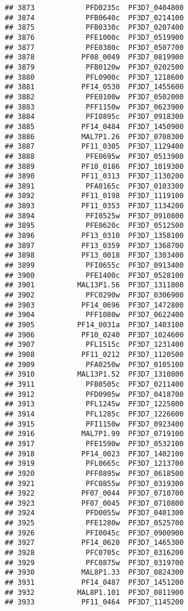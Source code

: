 \documentclass[12pt, a4paper]{article}\usepackage[]{graphicx}\usepackage[]{color}
\makeatletter
\newenvironment{kframe}{%
 \def\at@end@of@kframe{}%
 \ifinner\ifhmode%
  \def\at@end@of@kframe{\end{minipage}}%
  \begin{minipage}{\columnwidth}%
 \fi\fi%
 \def\FrameCommand##1{\hskip\@totalleftmargin \hskip-\fboxsep
 \colorbox{shadecolor}{##1}\hskip-\fboxsep
     \hskip-\linewidth \hskip-\@totalleftmargin \hskip\columnwidth}%
 \MakeFramed {\advance\hsize-\width
   \@totalleftmargin\z@ \linewidth\hsize
   \@setminipage}}%
 {\par\unskip\endMakeFramed%
 \at@end@of@kframe}
\newenvironment{knitrout}{}{} %
\makeatother
\begin{document}
\begin{knitrout}
\begin{kframe}
\begin{verbatim}
## 3873            PFD0235c  PF3D7_0404800
## 3874            PFB0640c  PF3D7_0214100
## 3875            PFB0330c  PF3D7_0207400
## 3876            PFE1000c  PF3D7_0519900
## 3877            PFE0380c  PF3D7_0507700
## 3878           PF08_0049  PF3D7_0819900
## 3879            PFB0120w  PF3D7_0202500
## 3880            PFL0900c  PF3D7_1218600
## 3881           PF14_0530  PF3D7_1455600
## 3882            PFE0100w  PF3D7_0502000
## 3883            PFF1150w  PF3D7_0623900
## 3884            PFI0895c  PF3D7_0918300
## 3885           PF14_0484  PF3D7_1450900
## 3886           MAL7P1.26  PF3D7_0708300
## 3887           PF11_0305  PF3D7_1129400
## 3888            PFE0695w  PF3D7_0513900
## 3889           PF10_0186  PF3D7_1019300
## 3890           PF11_0313  PF3D7_1130200
## 3891            PFA0165c  PF3D7_0103300
## 3892           PF11_0198  PF3D7_1119100
## 3893           PF11_0353  PF3D7_1134200
## 3894            PFI0525w  PF3D7_0910800
## 3895            PFE0620c  PF3D7_0512500
## 3896           PF13_0310  PF3D7_1358100
## 3897           PF13_0359  PF3D7_1368700
## 3898           PF13_0018  PF3D7_1303400
## 3899            PFI0655c  PF3D7_0913400
## 3900            PFE1400c  PF3D7_0528100
## 3901          MAL13P1.56  PF3D7_1311800
## 3902            PFC0290w  PF3D7_0306900
## 3903           PF14_0696  PF3D7_1472800
## 3904            PFF1080w  PF3D7_0622400
## 3905          PF14_0031a  PF3D7_1403100
## 3906           PF10_0240  PF3D7_1024600
## 3907            PFL1515c  PF3D7_1231400
## 3908           PF11_0212  PF3D7_1120500
## 3909            PFA0250w  PF3D7_0105100
## 3910          MAL13P1.52  PF3D7_1310800
## 3911            PFB0505c  PF3D7_0211400
## 3912            PFD0905w  PF3D7_0418700
## 3913            PFL1245w  PF3D7_1225800
## 3914            PFL1285c  PF3D7_1226600
## 3915            PFI1150w  PF3D7_0923400
## 3916           MAL7P1.99  PF3D7_0719100
## 3917            PFE1590w  PF3D7_0532100
## 3918           PF14_0023  PF3D7_1402100
## 3919            PFL0665c  PF3D7_1213700
## 3920            PFF0895w  PF3D7_0618500
## 3921            PFC0855w  PF3D7_0319300
## 3922           PF07_0044  PF3D7_0710700
## 3923           PF07_0045  PF3D7_0710800
## 3924            PFD0055w  PF3D7_0401300
## 3925            PFE1280w  PF3D7_0525700
## 3926            PFI0045c  PF3D7_0900900
## 3927           PF14_0620  PF3D7_1465300
## 3928            PFC0705c  PF3D7_0316200
## 3929            PFC0875w  PF3D7_0319700
## 3930           MAL8P1.33  PF3D7_0824300
## 3931           PF14_0487  PF3D7_1451200
## 3932          MAL8P1.101  PF3D7_0811900
## 3933           PF11_0464  PF3D7_1145200

\end{verbatim}
\end{kframe}
\end{knitrout}
\end{document}
